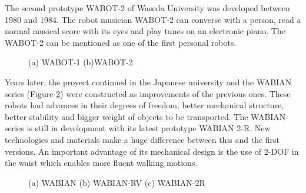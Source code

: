 The second prototype WABOT-2 of Waseda University was developed between 1980 and 1984. The robot musician WABOT-2 can converse with a person, read a normal musical score with its eyes and play tunes on an electronic piano. The WABOT-2 can be mentioned as one of the first personal robots.

\begin{figure}[!hbt]
\centering 
{}\hspace{10mm}
\caption{(a) WABOT-1 (b)WABOT-2}
\label{fig:wabot}
\end{figure}

Years later, the proyect continued in the Japanese university and the WABIAN series (Figure \ref{fig:wabian}) were constructed as improvements of the previous ones. These robots had advances in their degrees of freedom, better mechanical structure, better stability and bigger weight of objects to be transported. The WABIAN series is still in development with its latest prototype WABIAN 2-R. New technologies and materials make a huge difference between this and the first versions. An important advantage of its mechanical design is the use of 2-DOF in the waist which enables more fluent walking motions. 

\begin{figure}[!hbt]
\centering 
{}\hspace{10mm}
\hspace{10mm}
\caption{(a) WABIAN (b) WABIAN-RV (c) WABIAN-2R }
\label{fig:wabian}
\end{figure}



